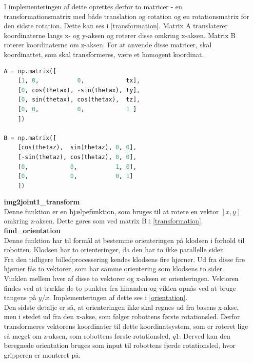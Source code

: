 I implementeringen af dette oprettes derfor to matricer - en transformationsmatrix med både translation og rotation og en rotationsmatrix for den sidste rotation. Dette kan ses i \autoref{transformation}. Matrix A translaterer koordinaterne langs x- og y-aksen og roterer disse omkring x-aksen. Matrix B roterer koordinaterne om z-aksen. For at anvende disse matricer, skal koordinattet, som skal transformeres, være et homogent koordinat.

\begin{lstlisting}[caption=Matricer til transformation., label=transformation, language=Python]
A = np.matrix([
    [1, 0,           0,            tx],
    [0, cos(thetax), -sin(thetax), ty],
    [0, sin(thetax), cos(thetax),  tz],
    [0, 0,           0,            1 ]
    ])

B = np.matrix([
    [cos(thetaz),  sin(thetaz), 0, 0],
    [-sin(thetaz), cos(thetaz), 0, 0],
    [0,            0,           1, 0],
    [0,            0,           0, 1]
    ])
\end{lstlisting}


\textbf{img2joint1\_transform} \\
Denne funktion er en hjælpefunktion, som bruges til at rotere en vektor $[x,y]$ omkring z-aksen. Dette gøres som ved matrix B i \autoref{transformation}. \\


\textbf{find\_orientation} \\
Denne funktion har til formål at bestemme orienteringen på klodsen i forhold til robotten. Klodsen har to orienteringer, da den har to ikke parallelle sider. \\

Fra den tidligere billedprocessering kendes klodsens fire hjørner. Ud fra disse fire hjørner fås to vektorer, som har samme orientering som klodsens to sider. Vinklen mellem hver af disse to vektorer og x-aksen er orienteringen. Vektoren findes ved at trække de to punkter fra hinanden og viklen opnås ved at bruge tangens på $y/x$. Implementeringen af dette ses i \autoref{orientation}. \\

Den sidste detalje er så, at orienteringen ikke skal regnes ud fra basens x-akse, men i stedet ud fra den x-akse, som følger robottens første rotationsled. Derfor transformeres vektorens koordinater til dette koordinatsystem, som er roteret lige så meget om z-aksen, som robottens første rotationsled, $q1$. Derved kan den beregnede orientation bruges som input til robottens fjerde rotationsled, hvor gripperen er monteret på. \\

